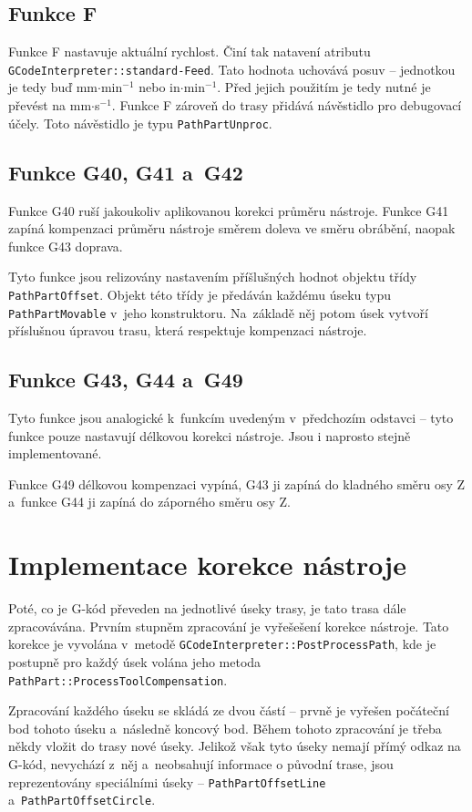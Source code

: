 			\subsection{Funkce F}
			Funkce F nastavuje aktuální rychlost. Činí tak natavení atributu {\tt GCodeInterpreter::standard-Feed}. Tato hodnota uchovává posuv -- jednotkou je tedy buď mm$\cdot$min$^{-1}$ nebo in$\cdot$min$^{-1}$. Před jejich použitím je tedy nutné je převést na mm$\cdot$s$^{-1}$. 
			Funkce F zároveň do trasy přidává návěstidlo pro debugovací účely. Toto návěstidlo je typu {\tt PathPartUnproc}.
			\subsection{Funkce G40, G41 a~G42}
			Funkce G40 ruší jakoukoliv aplikovanou korekci průměru nástroje. Funkce G41 zapíná kompenzaci průměru nástroje směrem doleva ve směru obrábění, naopak funkce G43 doprava.
			
			Tyto funkce jsou relizovány nastavením příšlušných hodnot objektu třídy {\tt PathPartOffset}. Objekt této třídy je předáván každému úseku typu {\tt PathPartMovable} v~jeho konstruktoru. Na~základě něj potom úsek vytvoří příslušnou úpravou trasu, která respektuje kompenzaci nástroje.
			\subsection{Funkce G43, G44 a~G49}
			Tyto funkce jsou analogické k~funkcím uvedeným v~předchozím odstavci -- tyto funkce pouze nastavují délkovou korekci nástroje. Jsou i naprosto stejně implementované.
			
			Funkce G49 délkovou kompenzaci vypíná, G43 ji zapíná do kladného směru osy Z a~funkce G44 ji zapíná do záporného směru osy Z.
	\section{Implementace korekce nástroje}\label{kap:korekce}
		Poté, co je G-kód převeden na jednotlivé úseky trasy, je tato trasa dále zpracovávána. Prvním stupněm zpracování je vyřešešení korekce nástroje. Tato korekce je vyvolána v~metodě {\tt GCodeInterpreter::PostProcessPath}, kde je postupně pro každý úsek volána jeho metoda {\tt PathPart::ProcessToolCompensation}.
		
		Zpracování každého úseku se skládá ze dvou částí -- prvně je vyřešen počáteční bod tohoto úseku a~následně koncový bod. Během tohoto zpracování je třeba někdy vložit do trasy nové úseky. Jelikož však tyto úseky nemají přímý odkaz na G-kód, nevychází z~něj a~neobsahují informace o původní trase, jsou reprezentovány speciálními úseky -- {\tt PathPartOffsetLine} a~{\tt PathPartOffsetCircle}. 
		
